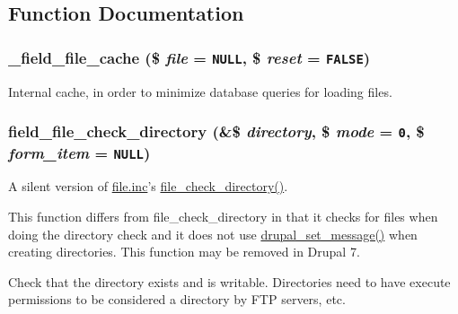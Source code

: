 \subsection{Function Documentation}
\hypertarget{field__file_8inc_e131f72d83f71a14c4b4311e654d77f5}{
\subsubsection[{\_\-field\_\-file\_\-cache}]{\setlength{\rightskip}{0pt plus 5cm}\_\-field\_\-file\_\-cache (\$ {\em file} = {\tt NULL}, \/  \$ {\em reset} = {\tt FALSE})}}
\label{field__file_8inc_e131f72d83f71a14c4b4311e654d77f5}


Internal cache, in order to minimize database queries for loading files. \hypertarget{field__file_8inc_1580d32589418f72cd928b93db4c571c}{
\subsubsection[{field\_\-file\_\-check\_\-directory}]{\setlength{\rightskip}{0pt plus 5cm}field\_\-file\_\-check\_\-directory (\&\$ {\em directory}, \/  \$ {\em mode} = {\tt 0}, \/  \$ {\em form\_\-item} = {\tt NULL})}}
\label{field__file_8inc_1580d32589418f72cd928b93db4c571c}


A silent version of \hyperlink{file_8inc}{file.inc}'s \hyperlink{group__file_g1cae9f6fea37182a71710f0209d586dd}{file\_\-check\_\-directory()}.

This function differs from file\_\-check\_\-directory in that it checks for files when doing the directory check and it does not use \hyperlink{bootstrap_8inc_d9223d86c7b08b1288274ce211d9bfa6}{drupal\_\-set\_\-message()} when creating directories. This function may be removed in Drupal 7.

Check that the directory exists and is writable. Directories need to have execute permissions to be considered a directory by FTP servers, etc.

